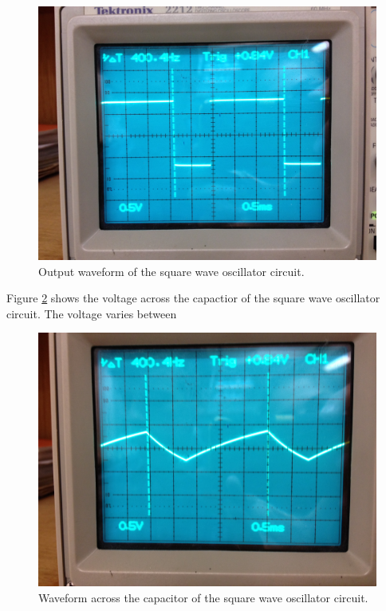 \documentclass[12pt,letterpaper]{report}
\newlength \figwidth
\begin{document}
\begin{figure}[H]
\centering
\includegraphics[width=\figwidth, keepaspectratio=true]{lab8_images/output.jpg}
\caption{Output waveform of the square wave oscillator circuit.}
\label{fig:output}
\end{figure}

Figure \ref{fig:cap} shows the voltage across the capactior of the square wave oscillator circuit. The voltage varies between 

\begin{figure}[H]
\centering
\includegraphics[width=\figwidth, keepaspectratio=true]{lab8_images/cap.jpg}
\caption{Waveform across the capacitor of the square wave oscillator circuit.}
\label{fig:cap}
\end{figure}
\end{document}
